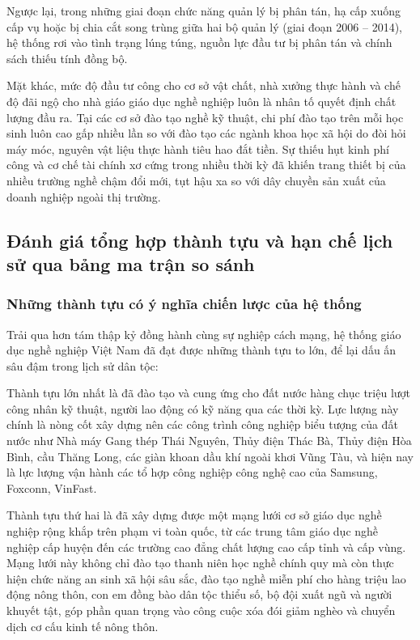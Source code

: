 Ngược lại, trong những giai đoạn chức năng quản lý bị phân tán, hạ cấp xuống cấp vụ hoặc bị chia cắt song trùng giữa hai bộ quản lý (giai đoạn 2006 -- 2014), hệ thống rơi vào tình trạng lúng túng, nguồn lực đầu tư bị phân tán và chính sách thiếu tính đồng bộ. 

Mặt khác, mức độ đầu tư công cho cơ sở vật chất, nhà xưởng thực hành và chế độ đãi ngộ cho nhà giáo giáo dục nghề nghiệp luôn là nhân tố quyết định chất lượng đầu ra. Tại các cơ sở đào tạo nghề kỹ thuật, chi phí đào tạo trên mỗi học sinh luôn cao gấp nhiều lần so với đào tạo các ngành khoa học xã hội do đòi hỏi máy móc, nguyên vật liệu thực hành tiêu hao đắt tiền. Sự thiếu hụt kinh phí công và cơ chế tài chính xơ cứng trong nhiều thời kỳ đã khiến trang thiết bị của nhiều trường nghề chậm đổi mới, tụt hậu xa so với dây chuyền sản xuất của doanh nghiệp ngoài thị trường.

\subsection{Đánh giá tổng hợp thành tựu và hạn chế lịch sử qua bảng ma trận so sánh}

\subsubsection{Những thành tựu có ý nghĩa chiến lược của hệ thống}

Trải qua hơn tám thập kỷ đồng hành cùng sự nghiệp cách mạng, hệ thống giáo dục nghề nghiệp Việt Nam đã đạt được những thành tựu to lớn, để lại dấu ấn sâu đậm trong lịch sử dân tộc:

Thành tựu lớn nhất là đã đào tạo và cung ứng cho đất nước hàng chục triệu lượt công nhân kỹ thuật, người lao động có kỹ năng qua các thời kỳ. Lực lượng này chính là nòng cốt xây dựng nên các công trình công nghiệp biểu tượng của đất nước như Nhà máy Gang thép Thái Nguyên, Thủy điện Thác Bà, Thủy điện Hòa Bình, cầu Thăng Long, các giàn khoan dầu khí ngoài khơi Vũng Tàu, và hiện nay là lực lượng vận hành các tổ hợp công nghiệp công nghệ cao của Samsung, Foxconn, VinFast.

Thành tựu thứ hai là đã xây dựng được một mạng lưới cơ sở giáo dục nghề nghiệp rộng khắp trên phạm vi toàn quốc, từ các trung tâm giáo dục nghề nghiệp cấp huyện đến các trường cao đẳng chất lượng cao cấp tỉnh và cấp vùng. Mạng lưới này không chỉ đào tạo thanh niên học nghề chính quy mà còn thực hiện chức năng an sinh xã hội sâu sắc, đào tạo nghề miễn phí cho hàng triệu lao động nông thôn, con em đồng bào dân tộc thiểu số, bộ đội xuất ngũ và người khuyết tật, góp phần quan trọng vào công cuộc xóa đói giảm nghèo và chuyển dịch cơ cấu kinh tế nông thôn.


